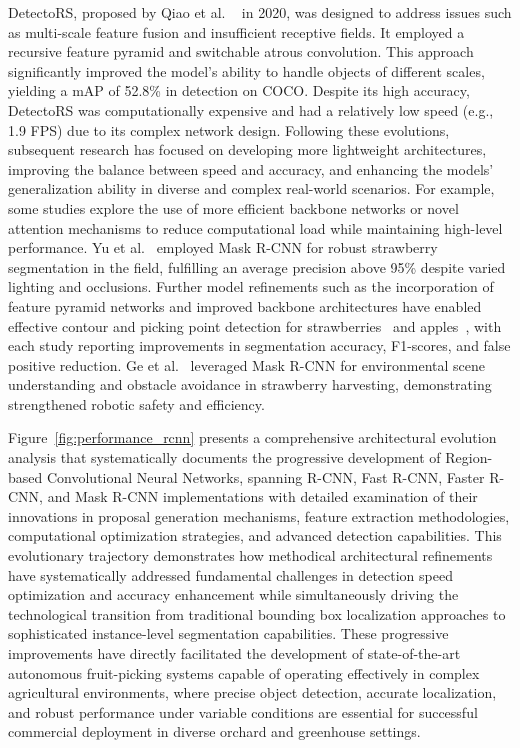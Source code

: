 \documentclass{ieeeaccess}
\begin{document}
DetectoRS, proposed by Qiao et al. ~\cite{qiao2021detectors} in 2020, was designed to address issues such as multi-scale feature fusion and insufficient receptive fields. It employed a recursive feature pyramid and switchable atrous convolution. This approach significantly improved the model's ability to handle objects of different scales, yielding a mAP of 52.8\% in detection on COCO. Despite its high accuracy, DetectoRS was computationally expensive and had a relatively low speed (e.g., 1.9 FPS) due to its complex network design.
Following these evolutions, subsequent research has focused on developing more lightweight architectures, improving the balance between speed and accuracy, and enhancing the models' generalization ability in diverse and complex real-world scenarios. For example, some studies explore the use of more efficient backbone networks or novel attention mechanisms to reduce computational load while maintaining high-level performance.
Yu et al.~\cite{yu2019fruit} employed Mask R-CNN for robust strawberry segmentation in the field, fulfilling an average precision above 95\% despite varied lighting and occlusions. Further model refinements such as the incorporation of feature pyramid networks and improved backbone architectures have enabled effective contour and picking point detection for strawberries~\cite{jia2020detection} and apples~\cite{chu2021deep}, with each study reporting improvements in segmentation accuracy, F1-scores, and false positive reduction. Ge et al.~\cite{ge2019fruit} leveraged Mask R-CNN for environmental scene understanding and obstacle avoidance in strawberry harvesting, demonstrating strengthened robotic safety and efficiency.

Figure~\ref{fig:performance_rcnn} presents a comprehensive architectural evolution analysis that systematically documents the progressive development of Region-based Convolutional Neural Networks, spanning R-CNN, Fast R-CNN, Faster R-CNN, and Mask R-CNN implementations with detailed examination of their innovations in proposal generation mechanisms, feature extraction methodologies, computational optimization strategies, and advanced detection capabilities. This evolutionary trajectory demonstrates how methodical architectural refinements have systematically addressed fundamental challenges in detection speed optimization and accuracy enhancement while simultaneously driving the technological transition from traditional bounding box localization approaches to sophisticated instance-level segmentation capabilities. These progressive improvements have directly facilitated the development of state-of-the-art autonomous fruit-picking systems capable of operating effectively in complex agricultural environments, where precise object detection, accurate localization, and robust performance under variable conditions are essential for successful commercial deployment in diverse orchard and greenhouse settings.
\end{document}
